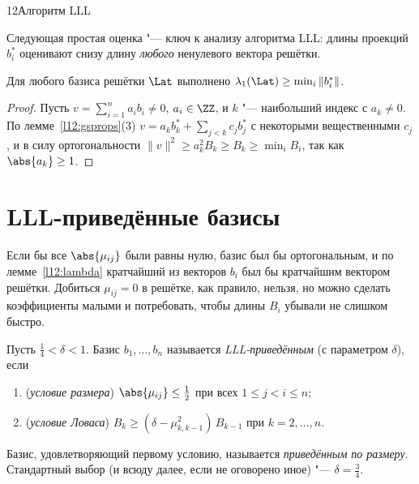 \begin{lecture}{12}{Алгоритм LLL}

Следующая простая оценка "--- ключ к анализу алгоритма LLL: длины проекций $b_i^*$ оценивают
снизу длину \emph{любого} ненулевого вектора решётки.

\begin{lemma}\label{l12:lambda}
Для любого базиса решётки $\Lat$ выполнено $\lambda_1(\Lat) \ge \min_i \|b_i^*\|$.
\end{lemma}

\begin{proof}
Пусть $v = \sum_{i=1}^n a_i b_i \ne 0$, $a_i \in \ZZ$, и $k$ "--- наибольший индекс
с $a_k \ne 0$. По лемме~\ref{l12:gsprops}(3)
$v = a_k b_k^* + \sum_{j<k} c_j b_j^*$ с некоторыми вещественными $c_j$, и в силу
ортогональности $\|v\|^2 \ge a_k^2 B_k \ge B_k \ge \min_i B_i$, так как $\abs{a_k} \ge 1$.
\end{proof}


\section{LLL-приведённые базисы}

Если бы все $\abs{\mu_{ij}}$ были равны нулю, базис был бы ортогональным, и по
лемме~\ref{l12:lambda} кратчайший из векторов $b_i$ был бы кратчайшим вектором решётки.
Добиться $\mu_{ij} = 0$ в решётке, как правило, нельзя, но можно сделать коэффициенты малыми
и потребовать, чтобы длины $B_i$ убывали не слишком быстро.

\begin{definition}\label{l12:reduced}
Пусть $\frac14 < \delta < 1$. Базис $b_1, \dots, b_n$ называется
\emph{LLL-приведённым} (с параметром $\delta$), если
\begin{enumerate}
  \item (\emph{условие размера}) $\abs{\mu_{ij}} \le \frac12$ при всех $1 \le j < i \le n$;
  \item (\emph{условие Ловаса}) $B_k \ge (\delta - \mu_{k,k-1}^2)\, B_{k-1}$ при
    $k = 2, \dots, n$.
\end{enumerate}
Базис, удовлетворяющий первому условию, называется \emph{приведённым по размеру}.
Стандартный выбор (и всюду далее, если не оговорено иное) "--- $\delta = \frac34$.
\end{definition}


\end{lecture}
